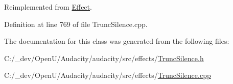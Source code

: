 Reimplemented from \hyperlink{class_effect_aa55e73977e578fd18c07c4628695ee4e}{Effect}.



Definition at line 769 of file Trunc\+Silence.\+cpp.



The documentation for this class was generated from the following files\+:\begin{DoxyCompactItemize}
\item 
C\+:/\+\_\+dev/\+Open\+U/\+Audacity/audacity/src/effects/\hyperlink{_trunc_silence_8h}{Trunc\+Silence.\+h}\item 
C\+:/\+\_\+dev/\+Open\+U/\+Audacity/audacity/src/effects/\hyperlink{_trunc_silence_8cpp}{Trunc\+Silence.\+cpp}\end{DoxyCompactItemize}
